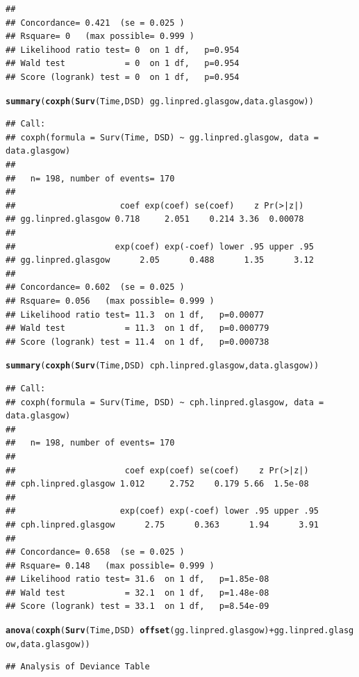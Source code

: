 \documentclass{article}\usepackage[]{graphicx}\usepackage[]{color}
\makeatletter
\newcommand{\hlopt}[1]{\textcolor[rgb]{0,0,0}{#1}}%
\newcommand{\hlstd}[1]{\textcolor[rgb]{0.345,0.345,0.345}{#1}}%
\newcommand{\hlkwd}[1]{\textcolor[rgb]{0.737,0.353,0.396}{\textbf{#1}}}%
\newenvironment{kframe}{%
 \def\at@end@of@kframe{}%
 \ifinner\ifhmode%
  \def\at@end@of@kframe{\end{minipage}}%
  \begin{minipage}{\columnwidth}%
 \fi\fi%
 \def\FrameCommand##1{\hskip\@totalleftmargin \hskip-\fboxsep
 \colorbox{shadecolor}{##1}\hskip-\fboxsep
     \hskip-\linewidth \hskip-\@totalleftmargin \hskip\columnwidth}%
 \MakeFramed {\advance\hsize-\width
   \@totalleftmargin\z@ \linewidth\hsize
   \@setminipage}}%
 {\par\unskip\endMakeFramed%
 \at@end@of@kframe}
\newenvironment{knitrout}{}{} %
\makeatother
\begin{document}
\begin{knitrout}
\begin{kframe}
\begin{verbatim}
## 
## Concordance= 0.421  (se = 0.025 )
## Rsquare= 0   (max possible= 0.999 )
## Likelihood ratio test= 0  on 1 df,   p=0.954
## Wald test            = 0  on 1 df,   p=0.954
## Score (logrank) test = 0  on 1 df,   p=0.954
\end{verbatim}
\begin{alltt}
\hlkwd{summary}\hlstd{(}\hlkwd{coxph}\hlstd{(}\hlkwd{Surv}\hlstd{(Time, DSD)} \hlopt{~} \hlstd{gg.linpred.glasgow, data.glasgow))}
\end{alltt}
\begin{verbatim}
## Call:
## coxph(formula = Surv(Time, DSD) ~ gg.linpred.glasgow, data = data.glasgow)
## 
##   n= 198, number of events= 170 
## 
##                     coef exp(coef) se(coef)    z Pr(>|z|)
## gg.linpred.glasgow 0.718     2.051    0.214 3.36  0.00078
## 
##                    exp(coef) exp(-coef) lower .95 upper .95
## gg.linpred.glasgow      2.05      0.488      1.35      3.12
## 
## Concordance= 0.602  (se = 0.025 )
## Rsquare= 0.056   (max possible= 0.999 )
## Likelihood ratio test= 11.3  on 1 df,   p=0.00077
## Wald test            = 11.3  on 1 df,   p=0.000779
## Score (logrank) test = 11.4  on 1 df,   p=0.000738
\end{verbatim}
\begin{alltt}
\hlkwd{summary}\hlstd{(}\hlkwd{coxph}\hlstd{(}\hlkwd{Surv}\hlstd{(Time, DSD)} \hlopt{~} \hlstd{cph.linpred.glasgow, data.glasgow))}
\end{alltt}
\begin{verbatim}
## Call:
## coxph(formula = Surv(Time, DSD) ~ cph.linpred.glasgow, data = data.glasgow)
## 
##   n= 198, number of events= 170 
## 
##                      coef exp(coef) se(coef)    z Pr(>|z|)
## cph.linpred.glasgow 1.012     2.752    0.179 5.66  1.5e-08
## 
##                     exp(coef) exp(-coef) lower .95 upper .95
## cph.linpred.glasgow      2.75      0.363      1.94      3.91
## 
## Concordance= 0.658  (se = 0.025 )
## Rsquare= 0.148   (max possible= 0.999 )
## Likelihood ratio test= 31.6  on 1 df,   p=1.85e-08
## Wald test            = 32.1  on 1 df,   p=1.48e-08
## Score (logrank) test = 33.1  on 1 df,   p=8.54e-09
\end{verbatim}
\begin{alltt}
\hlkwd{anova}\hlstd{(}\hlkwd{coxph}\hlstd{(}\hlkwd{Surv}\hlstd{(Time, DSD)} \hlopt{~} \hlkwd{offset}\hlstd{(gg.linpred.glasgow)} \hlopt{+} \hlstd{gg.linpred.glasgow, data.glasgow))}
\end{alltt}
\begin{verbatim}
## Analysis of Deviance Table

\end{verbatim}
\end{kframe}
\end{knitrout}
\end{document}

